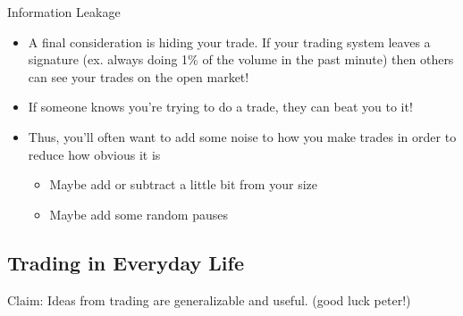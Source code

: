 Information Leakage
\begin{itemize}
    \item A final consideration is hiding your trade. If your trading system leaves a signature (ex. always doing 1\% of the volume in the past minute) then others can see your trades on the open market!
    \item If someone knows you're trying to do a trade, they can beat you to it!
    \item Thus, you'll often want to add some noise to how you make trades in order to reduce how obvious it is
        \begin{itemize}
            \item Maybe add or subtract a little bit from your size
            \item Maybe add some random pauses
        \end{itemize}
\end{itemize}

\subsection{Trading in Everyday Life}
Claim: Ideas from trading are generalizable and useful. (good luck peter!)


